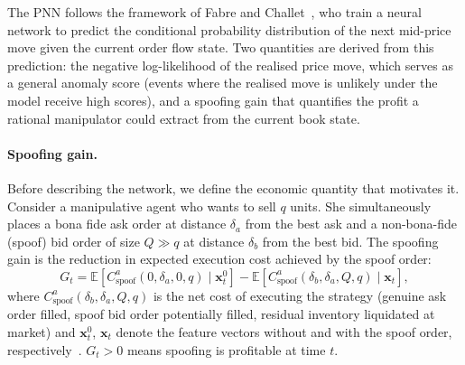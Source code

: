 \documentclass[11pt]{report}
\begin{document}
The PNN follows the framework of Fabre and Challet~\cite{fabre_2025}, who train a neural network to predict the conditional probability distribution of the next mid-price move given the current order flow state. Two quantities are derived from this prediction: the negative log-likelihood of the realised price move, which serves as a general anomaly score (events where the realised move is unlikely under the model receive high scores), and a spoofing gain that quantifies the profit a rational manipulator could extract from the current book state.

\paragraph{Spoofing gain.}
Before describing the network, we define the economic quantity that motivates it. Consider a manipulative agent who wants to sell $q$ units. She simultaneously places a bona fide ask order at distance $\delta_a$ from the best ask and a non-bona-fide (spoof) bid order of size $Q \gg q$ at distance $\delta_b$ from the best bid. The spoofing gain is the reduction in expected execution cost achieved by the spoof order:
\begin{equation}
  \label{eq:spoofing_gain}
  G_t = \mathbb{E}\!\left[C^a_{\text{spoof}}(0, \delta_a, 0, q) \mid \mathbf{x}^0_t\right] - \mathbb{E}\!\left[C^a_{\text{spoof}}(\delta_b, \delta_a, Q, q) \mid \mathbf{x}_t\right],
\end{equation}
where $C^a_{\text{spoof}}(\delta_b, \delta_a, Q, q)$ is the net cost of executing the strategy (genuine ask order filled, spoof bid order potentially filled, residual inventory liquidated at market) and $\mathbf{x}^0_t$, $\mathbf{x}_t$ denote the feature vectors without and with the spoof order, respectively~\cite{fabre_2025}.
$G_t > 0$ means spoofing is profitable at time $t$.
\end{document}
